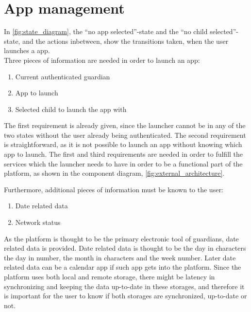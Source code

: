 \section{App management}
\label{sec:app_management}

\label{sec:appman_requirements}

In \autoref{fig:state_diagram}, the ``no app selected''-state and the ``no child selected''-state, and the actions inbetween, show the transitions taken, when the user launches a \giraf[] app. \\


\noindent Three pieces of information are needed in order to launch an app:

\begin{enumerate}
	\item Current authenticated guardian
	\item App to launch
	\item Selected child to launch the app with
\end{enumerate}

The first requirement is already given, since the launcher cannot be in any of the two states without the user already being authenticated.
The second requirement is straightforward, as it is not possible to launch an app without knowing which app to launch.
The first and third requirements are needed in order to fulfill the services which the launcher needs to have in order to be a functional part of the \giraf[] platform, as shown in the component diagram, \autoref{fig:external_architecture}.

Furthermore, additional pieces of information must be known to the user:

\begin{enumerate}
	\item Date related data
	\item Network status 
\end{enumerate}

As the \giraf[] platform is thought to be the primary electronic tool of guardians, date related data is provided. Date related data is thought to be the day in characters the day in number, the month in characters and the week number. Later date related data can be a calendar app if such app gets into the \giraf[] platform.
Since the \giraf[] platform uses both local and remote storage, there might be latency in synchronizing and keeping the data up-to-date in these storages, and therefore it is important for the user to know if both storages are synchronized, up-to-date or not.

